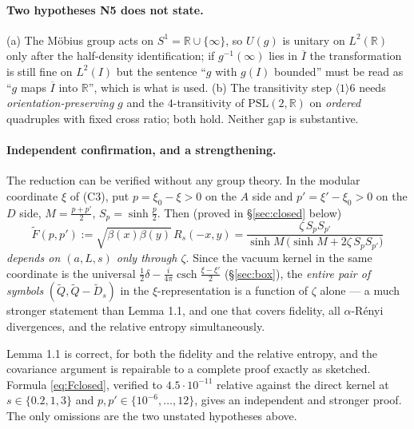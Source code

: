 \documentclass[11pt]{article}
\begin{document}

\paragraph{Two hypotheses N5 does not state.}
(a) The M\"obius group acts on $S^1=\mathbb R\cup\{\infty\}$, so $U(g)$ is unitary on
$L^2(\mathbb R)$ only after the half-density identification; if $g^{-1}(\infty)$ lies in
$\overline I$ the transformation is still fine on $L^2(I)$ but the sentence ``$g$ with $g(I)$
bounded'' must be read as ``$g$ maps $\overline I$ into $\mathbb R$'', which is what is used.
(b) The transitivity step $\langle1\rangle6$ needs \emph{orientation-preserving} $g$ and the
$4$-transitivity of $\mathrm{PSL}(2,\mathbb R)$ on \emph{ordered} quadruples with fixed cross
ratio; both hold.  Neither gap is substantive.

\paragraph{Independent confirmation, and a strengthening.}
The reduction can be verified without any group theory.  In the modular coordinate
$\xi$ of (C3), put $p=\xi_0-\xi>0$ on the $A$ side and $p'=\xi'-\xi_0>0$ on the $D$ side,
$M=\tfrac{p+p'}2$, $S_p=\sinh\tfrac p2$.  Then (proved in \S\ref{sec:closed} below)
\begin{equation}\label{eq:Fclosed}
 \boxed{\ \widetilde F(p,p'):=\sqrt{\beta(x)\beta(y)}\,R_s(-x,y)
 =\frac{\zeta\,S_pS_{p'}}{\sinh M\,\bigl(\sinh M+2\zeta\,S_pS_{p'}\bigr)}\ }
\end{equation}
\emph{depends on $(a,L,s)$ only through $\zeta$}.  Since the vacuum kernel in the same
coordinate is the universal $\tfrac12\delta-\tfrac i{4\pi}\operatorname{csch}\frac{\xi-\xi'}2$
(\S\ref{sec:box}), the \emph{entire pair of symbols} $(\widetilde Q,\widetilde Q-\widetilde D_s)$
in the $\xi$-representation is a function of $\zeta$ alone --- a much stronger statement than
Lemma 1.1, and one that covers fidelity, all $\alpha$-R\'enyi divergences, and the relative
entropy simultaneously.

\begin{verdictok}
Lemma 1.1 is correct, for both the fidelity and the relative entropy, and the covariance argument
is repairable to a complete proof exactly as sketched.  Formula \eqref{eq:Fclosed}, verified to
$4.5\cdot10^{-11}$ relative against the direct kernel at $s\in\{0.2,1,3\}$ and
$p,p'\in\{10^{-6},\dots,12\}$, gives an independent and stronger proof.  The only omissions are
the two unstated hypotheses above.
\end{verdictok}
\end{document}
